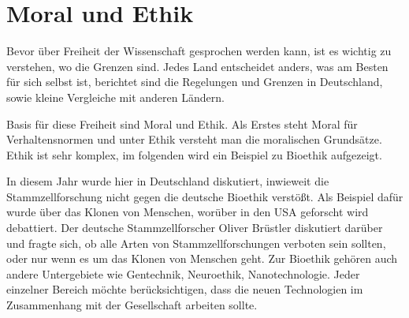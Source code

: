 \documentclass{pmwk}
\begin{document}
\nocite{01,02,03,04,05,06,DeuFunk,forschfoerd,fiff,gvw}

\Abgabeblatt{}{}{}{}




\section*{Moral und Ethik}
Bevor über Freiheit der Wissenschaft gesprochen werden kann, ist es wichtig zu verstehen, wo die Grenzen sind. Jedes Land entscheidet anders, was am Besten für sich selbst ist, berichtet sind die Regelungen und Grenzen in Deutschland, sowie kleine Vergleiche mit anderen Ländern. \par
Basis für diese Freiheit sind Moral und Ethik. Als Erstes steht Moral für Verhaltensnormen und unter Ethik versteht man die moralischen Grundsätze. Ethik ist sehr komplex, im folgenden wird ein Beispiel zu Bioethik aufgezeigt. \par
In diesem Jahr wurde hier in Deutschland diskutiert, inwieweit die Stammzellforschung nicht gegen die deutsche Bioethik verstößt. Als Beispiel dafür wurde über das Klonen von Menschen, worüber in den USA geforscht wird debattiert. Der deutsche Stammzellforscher Oliver Brüstler diskutiert darüber und fragte sich, ob alle Arten von Stammzellforschungen verboten sein sollten, oder nur wenn es um das Klonen von Menschen geht.\cite{Bruestle}  Zur Bioethik gehören auch andere Untergebiete wie Gentechnik, Neuroethik, Nanotechnologie. Jeder einzelner Bereich möchte berücksichtigen, dass die neuen Technologien im Zusammenhang mit der Gesellschaft arbeiten sollte.  \cite{bpb} \par
 
\end{document}
